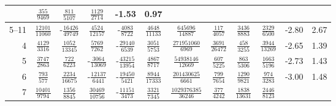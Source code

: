 \documentclass[letterpaper,11pt,nointlimits,reqno,draft]{amsbook}
\begin{document}
\begin{table}
\begin{tabular}{r|ccccccccc|c@{ -- }c@{\%}}
&  $\frac{             355}{            9469}$
&  $\frac{             811}{            5107}$
&  $\frac{            1129}{            2714}$
&  -1.53 &  0.97
\\ \hline
5--11
&  $\frac{           12101}{           11060}$
& -$\frac{           16426}{           49749}$
&  $\frac{            4524}{           12157}$
& -$\frac{            4083}{            8722}$
&  $\frac{            4648}{           11133}$
&  $\frac{          645696}{           14887}$
&  $\frac{             117}{            4057}$
&  $\frac{            3436}{            8883}$
&  $\frac{            2329}{            6500}$
&  -2.80 &  2.67
\\
4
&  $\frac{            4129}{            3316}$
&  $\frac{            1052}{           13345}$
&  $\frac{            5769}{            7262}$
& -$\frac{           29140}{            6539}$
&  $\frac{            3051}{            5753}$
&  $\frac{       271951060}{            6969}$
&  $\frac{            3691}{           26472}$
&  $\frac{             458}{            3255}$
&  $\frac{            3944}{           13269}$
&  -2.65 &  1.39
\\
5
&  $\frac{            3747}{            2863}$
&  $\frac{             722}{            6223}$
& -$\frac{            3064}{           13069}$
& -$\frac{           43215}{           13954}$
&  $\frac{            4867}{            8717}$
&  $\frac{        54938146}{           12669}$
&  $\frac{             607}{            5225}$
&  $\frac{             863}{            5306}$
&  $\frac{            1663}{            5196}$
&  -2.73 &  1.43
\\
6
&  $\frac{             793}{             577}$
&  $\frac{            2234}{           16675}$
& -$\frac{           12137}{            6441}$
& -$\frac{           19450}{            5421}$
&  $\frac{            8944}{           17333}$
&  $\frac{       201430625}{            6661}$
&  $\frac{             799}{            7654}$
&  $\frac{            1290}{            9821}$
&  $\frac{             974}{            3283}$
&  -3.00 &  1.48
\\
7
&  $\frac{           10401}{            9794}$
&  $\frac{            1356}{            8845}$
&  $\frac{           30469}{           10756}$
& -$\frac{           11151}{            3473}$
&  $\frac{            3321}{            7345}$
&  $\frac{      1029376385}{           36246}$
&  $\frac{             377}{            4242}$
&  $\frac{            1838}{           13631}$
&  $\frac{            2446}{            8123}$

\end{tabular}
\end{table}
\end{document}
